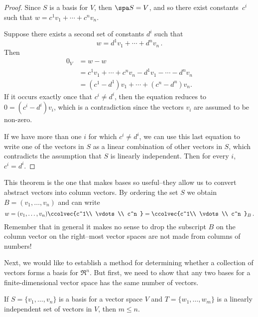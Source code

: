 \begin{proof}
Since $S$ is a basis for $V$, then $\spa S=V$, and so there exist constants~$c^i$ such that $w=c^1v_1+\cdots + c^nv_n$.

Suppose there exists a second set of constants $d^i$ such that 
\[w=d^1v_1+\cdots + d^nv_n\, .\]  Then
\begin{align*}
0_V&=w-w\\
&=c^1v_1+\cdots + c^nv_n-d^1v_1-\cdots - d^nv_n \\[1mm]
&=(c^1-d^1)v_1+\cdots + (c^n-d^n)v_n.
\end{align*}
If it occurs exactly once that $c^i\neq d^i$, then the equation reduces to $0=(c^i-d^i)v_i$, which is a contradiction since the vectors $v_i$ are assumed to be non-zero.

If we have more than one $i$ for which $c^i\neq d^i$, we can use this last equation to write one of the vectors in $S$ as a linear combination of other vectors in $S$, which contradicts the assumption that $S$ is linearly independent.  Then for every $i$, $c^i=d^i$.
\end{proof}


\begin{remark}
This theorem is the one that makes bases so useful--they allow us to convert abstract vectors into column vectors.
By ordering the set $S$ we obtain $B=(v_1,\ldots,v_n)$ and can write
\[
w=(v_1,\ldots,v_n) \ccolvec{c^1\\ \vdots\\ c^n }=\ccolvec{c^1\\ \vdots\\ c^n }_B\, .
\]
Remember that in general it makes no sense to drop the subscript $B$ on the column vector on the right--most vector spaces  are not made from  columns of numbers!
\end{remark}


Next, we would like to establish a method for determining whether a collection of vectors forms a basis for $\Re^n$.  But first, we need to show that any two bases for a finite-dimensional vector space has the same number of vectors.

\begin{lemma}\label{mlessn}
If $S=\{v_1, \ldots, v_n \}$ is a basis for a vector space $V$ and $T=\{w_1, \ldots, w_m \}$ is a linearly independent set of vectors in $V$, then $m\leq n$.
\end{lemma}

